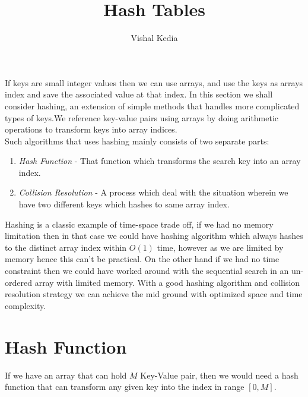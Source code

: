 \documentclass[10pt,a4paper,draft]{article}
\author{Vishal Kedia}
\title{Hash Tables}
\begin{document}
\maketitle

If keys are small integer values then we can use arrays, and use the keys as arrays index and save the associated value at that index. In this section we shall consider hashing, an extension of simple methods that handles more complicated types of keys.We reference key-value pairs using arrays by doing arithmetic operations to transform keys into array indices.
\\
Such algorithms that uses hashing mainly consists of two separate parts:
\begin{enumerate}
\item \emph{Hash Function} - That function which transforms the search key into an array index.
\item \emph{Collision Resolution} - A process which deal with the situation wherein we have two different keys which hashes to same array index.
\end{enumerate}
\par Hashing is a classic example of time-space trade off, if we had no memory limitation then in that case we could have hashing algorithm which always hashes to the distinct array index within $O(1)$ time, however as we are limited by memory hence this can't be practical. On the other hand if we had no time constraint then we could have worked around with the sequential search in an un-ordered array with limited memory. With a good hashing algorithm and collision resolution strategy we can achieve the mid ground with optimized space and time complexity.
\section{Hash Function}
If we have an array that can hold $M$ Key-Value pair, then we would need a hash function that can transform any given key into the index in range $[0,M]$.
\end{document}
